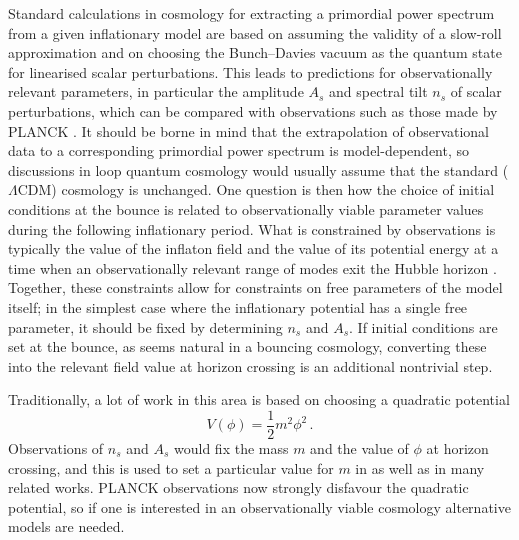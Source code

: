 \documentclass[aps,prd,11pt,showkeys,nofootinbib]{revtex4-2}
\begin{document}
Standard calculations in cosmology for extracting a primordial power spectrum from a given inflationary model \cite{Baumann_2022} are based on assuming the validity of a slow-roll approximation and on choosing the Bunch--Davies vacuum as the quantum state for linearised scalar perturbations. This leads to predictions for observationally relevant parameters, in particular the amplitude $A_s$ and spectral tilt $n_s$ of scalar perturbations, which can be compared with observations such as those made by PLANCK \cite{Planck:2018jri}. It should be borne in mind that the extrapolation of observational data to a corresponding primordial power spectrum is model-dependent, so discussions in loop quantum cosmology would usually assume that the standard ($\Lambda$CDM) cosmology is unchanged. One question is then how the choice of initial conditions at the bounce is related to observationally viable parameter values during the following inflationary period. What is constrained by observations is typically the value of the inflaton field and the value of its potential energy at a time when an observationally relevant range of modes exit the Hubble horizon \cite{Baumann_2022}. Together, these constraints allow for constraints on free parameters of the model itself; in the simplest case where the inflationary potential has a single free parameter, it should be fixed by determining $n_s$ and $A_s$. If initial conditions are set at the bounce, as seems natural in a bouncing cosmology, converting these into the relevant field value at horizon crossing is an additional nontrivial step.

Traditionally, a lot of work in this area is based on choosing a quadratic potential
\begin{equation}
    V(\phi)=\frac{1}{2}m^2\phi^2\,.
\end{equation}
Observations of $n_s$ and $A_s$ would fix the mass $m$ and the value of $\phi$ at horizon crossing, and this is used to set a particular value for $m$ in \cite{Ashtekar:2009mm,Ashtekar:2011rm} as well as in many related works. PLANCK observations now strongly disfavour the quadratic potential, so if one is interested in an observationally viable cosmology alternative models are needed.
\end{document}
